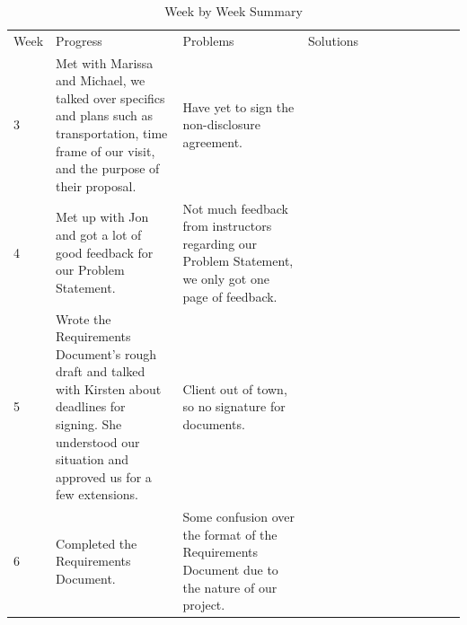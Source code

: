 \documentclass[onecolumn, draftclsnofoot,10pt, compsoc]{IEEEtran}
\begin{document}
\begin{table}[]
\centering
\caption{Week by Week Summary}
\label{my-label}
\begin{tabular}{|l|p{0.3\linewidth}|p{0.3\linewidth}|p{0.3\linewidth}|p{0.3\linewidth}}
\cline{1-4}
Week & Progress                                                                                                                                                             & Problems                                                                                                                            & Solutions                                                                                                                                         &  \\ \cline{1-4}
3    & Met with Marissa and Michael, we talked over specifics and plans such as transportation, time frame of our visit, and the purpose of their proposal.                  &   Have yet to sign the non-disclosure agreement.                                                                                                                                &                                                                                                                                                 &  \\ \cline{1-4}
4    & Met up with Jon and got a lot of good feedback for our Problem Statement.                                                                                             &    Not much feedback from instructors regarding our Problem Statement, we only got one page of feedback. &                                                                                                                                                 &  \\ \cline{1-4}
5    & Wrote the Requirements Document’s rough draft and talked with Kirsten about deadlines for signing. She understood our situation and approved us for a few extensions. &   Client out of town, so no signature for documents.                                                                                                                                &                                                                                                                                                 &  \\ \cline{1-4}
6    & Completed the Requirements Document.                                                                                                                                  &      Some confusion over the format of the Requirements Document due to the nature of our project.                                                                                                                             &                                                                                                                                                 &  \\ \cline{1-4}

\end{tabular}
\end{table}
\end{document}
